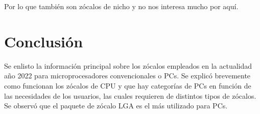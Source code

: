 \documentclass[conference]{IEEEtran}
\begin{document}
    \bigbreak

    Por lo que también son zócalos de nicho y no nos interesa mucho por aquí.

    \section{Conclusión}\label{sec:conclusion}

    Se enlisto la información principal sobre los zócalos empleados en la
    actualidad año 2022 para microprocesadores convencionales o PCs. Se
    explicó brevemente como funcionan los zócalos de CPU y que hay categorías
    de PCs en función de las necesidades de los usuarios, las cuales
    requieren de distintos tipos de zócalos. Se observó que el paquete de
    zócalo LGA es el más utilizado para PCs.

    \printbibliography
\end{document}
